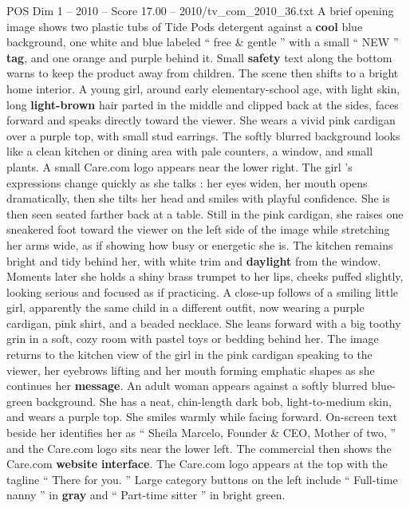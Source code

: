 \begin{textsample}{POS Dim 1 – 2010 – Score 17.00 – 2010/tv\_com\_2010\_36.txt}  \label{ex:f1_pos_025}
A brief opening image shows two plastic tubs of Tide Pods detergent against a \textbf{cool} blue background, one white and blue labeled “ free \& gentle ” with a small “ NEW ” \textbf{tag}, and one orange and purple behind it.
Small \textbf{safety} text along the bottom warns to keep the product away from children.
The scene then shifts to a bright home interior.
A young girl, around early elementary-school age, with light skin, long \textbf{light-brown} hair parted in the middle and clipped back at the sides, faces forward and speaks directly toward the viewer.
She wears a vivid pink cardigan over a purple top, with small stud earrings.
The softly blurred background looks like a clean kitchen or dining area with pale counters, a window, and small plants.
A small Care.com logo appears near the lower right.
The girl ’s expressions change quickly as she talks : her eyes widen, her mouth opens dramatically, then she tilts her head and smiles with playful confidence.
She is then seen seated farther back at a table.
Still in the pink cardigan, she raises one sneakered foot toward the viewer on the left side of the image while stretching her arms wide, as if showing how busy or energetic she is.
The kitchen remains bright and tidy behind her, with white trim and \textbf{daylight} from the window.
Moments later she holds a shiny brass trumpet to her lips, cheeks puffed slightly, looking serious and focused as if practicing.
A close-up follows of a smiling little girl, apparently the same child in a different outfit, now wearing a purple cardigan, pink shirt, and a beaded necklace.
She leans forward with a big toothy grin in a soft, cozy room with pastel toys or bedding behind her.
The image returns to the kitchen view of the girl in the pink cardigan speaking to the viewer, her eyebrows lifting and her mouth forming emphatic shapes as she continues her \textbf{message}.
An adult woman appears against a softly blurred blue-green background.
She has a neat, chin-length dark bob, light-to-medium skin, and wears a purple top.
She smiles warmly while facing forward.
On-screen text beside her identifies her as “ Sheila Marcelo, Founder \& CEO, Mother of two, ” and the Care.com logo sits near the lower left.
The commercial then shows the Care.com \textbf{website} \textbf{interface}.
The Care.com logo appears at the top with the tagline “ There for you. ” Large category buttons on the left include “ Full-time nanny ” in \textbf{gray} and “ Part-time sitter ” in bright green.

\end{textsample}
